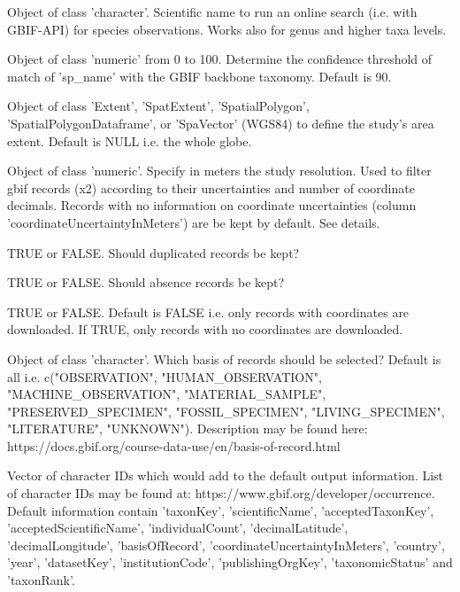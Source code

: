 \documentclass[a4paper]{book}
\begin{document}
\begin{Arguments}
\begin{ldescription}
\item[\code{sp\_name}] Object of class 'character'. Scientific name to run an online search
(i.e. with GBIF-API) for species observations. Works also for genus and higher taxa
levels.

\item[\code{conf\_match}] Object of class 'numeric' from 0 to 100. Determine the confidence
threshold of match of 'sp\_name' with the GBIF backbone taxonomy. Default is 90.

\item[\code{geo}] Object of class 'Extent', 'SpatExtent', 'SpatialPolygon', 'SpatialPolygonDataframe',
or 'SpaVector' (WGS84) to define the study's area extent. Default is NULL i.e. the whole globe.

\item[\code{grain}] Object of class 'numeric'. Specify in meters the study resolution. Used to
filter gbif records (x2) according to their uncertainties and number of coordinate
decimals. Records with no information on coordinate uncertainties (column
'coordinateUncertaintyInMeters') are be kept by default. See details.

\item[\code{duplicates}] TRUE or FALSE. Should duplicated records be kept?

\item[\code{absences}] TRUE or FALSE. Should absence records be kept?

\item[\code{no\_xy}] TRUE or FALSE. Default is FALSE i.e. only records with coordinates are
downloaded. If TRUE, only records with no coordinates are downloaded.

\item[\code{basis}] Object of class 'character'. Which basis of records should be selected?
Default is all i.e. c("OBSERVATION", "HUMAN\_OBSERVATION", "MACHINE\_OBSERVATION",
"MATERIAL\_SAMPLE", "PRESERVED\_SPECIMEN", "FOSSIL\_SPECIMEN", "LIVING\_SPECIMEN", "LITERATURE",
"UNKNOWN"). Description may be found here: https://docs.gbif.org/course-data-use/en/basis-of-record.html

\item[\code{add\_infos}] Vector of character IDs which would add to the default output information.
List of character IDs may be found at: https://www.gbif.org/developer/occurrence.
Default information contain 'taxonKey', 'scientificName', 'acceptedTaxonKey',
'acceptedScientificName', 'individualCount', 'decimalLatitude', 'decimalLongitude',
'basisOfRecord', 'coordinateUncertaintyInMeters', 'country', 'year', 'datasetKey', 
'institutionCode', 'publishingOrgKey', 'taxonomicStatus' and 'taxonRank'.


\end{ldescription}
\end{Arguments}
\end{document}
